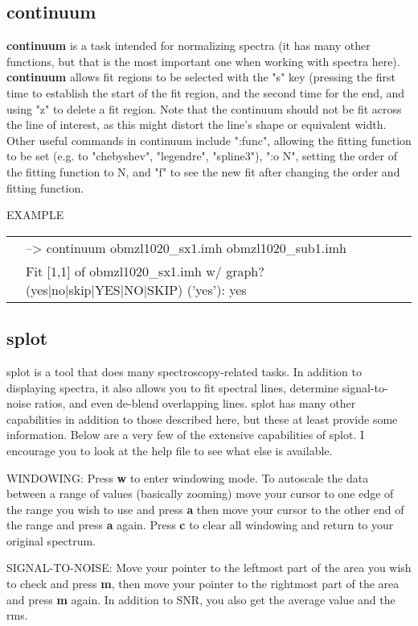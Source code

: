 \subsection{{\bf continuum}}

{\bf continuum} is a task intended for normalizing spectra (it has many other functions, but that is the most important one when working with spectra here). {\bf continuum} allows fit regions to be selected with the "s" key (pressing the first time to establish the start of the fit region, and the second time for the end, and using "z" to delete a fit region. Note that the continuum should not be fit across the line of interest, as this might distort the line's shape or equivalent width.
Other useful commands in continuum include ":func", allowing the fitting function to be set (e.g. to "chebyshev", "legendre", "spline3"), ":o N", setting the order of the fitting function to N, and "f" to see the new fit after changing the order and fitting function.

EXAMPLE

\begin{tabular}{ll}
&{\color{RoyalBlue} --> continuum obmzl1020\_sx1.imh obmzl1020\_sub1.imh} \\
& {\color{Green}Fit [1,1] of obmzl1020\_sx1.imh w/ graph? (yes|no|skip|YES|NO|SKIP) ('yes'): yes}
\end{tabular}

\subsection{{\bf splot}}
splot is a tool that does many spectroscopy-related tasks. In addition to displaying spectra, it also allows you to fit spectral lines, determine signal-to-noise ratios, and even de-blend overlapping lines. splot has many other capabilities in addition to those described here, but these at least provide some information. Below are a very few of the extensive capabilities of splot. I encourage you to look at the help file to see what else is available.

WINDOWING: Press {\bf w} to enter windowing mode. To autoscale the data between a range of values (basically zooming) move your cursor to one edge of the range you wish to use and press {\bf a} then move your cursor to the other end of the range and press {\bf a} again. Press {\bf c} to clear all windowing and return to your original spectrum.

SIGNAL-TO-NOISE: Move your pointer to the leftmost part of the area you wish to check and press {\bf m}, then move your pointer to the rightmost part of the area and press {\bf m} again. In addition to SNR, you also get the average value and the rms.


